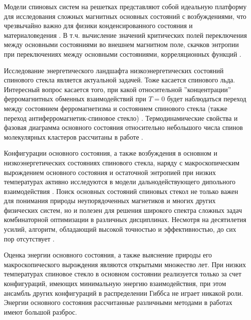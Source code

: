 \documentclass[utf8, babel, sor, jor, amsmath, amssymb, reprint]{elsarticle} %
\begin{document}
Модели спиновых систем на решетках представляют собой идеальную платформу для исследования сложных магнитных основных состояний с возбуждениями, что чрезвычайно важно для физики конденсированного состояния и материаловедения \cite{lacroix2011introduction}. В т.ч. вычисление значений критических полей переключения между основными состояниями во внешнем магнитном поле, скачков энтропии при переключениях между основными состояниями, корреляционных функций \cite{ramirez2004effect, rosas2004random, andriushchenko2019large}. 

Исследование энергетического ландшафта низкоэнергетических состояний спинового стекла \cite{biswas2023energy} является актуальной задачей. Тоже касается спинового льда. Интересный вопрос касается того, при какой относительной ''концентрации''  ферромагнитных обменных взаимодействий при $T=0$ будет наблюдаться переход между состоянием ферро\-маг\-не\-тиз\-ма и состоянием спинового стекла (также переход анти\-ферро\-маг\-не\-тик-спиновое стекло) \cite{gruzberg2001random, honecker2001universality, picco2006strong, tsomokos2011interplay, zimmer2022role}. Термодинамические свойства и фазовая диаграмма основного состояния относительно небольшого числа спинов молекулярных кластеров рассчитаны в работе \cite{dias2023ground}.

Конфигурации основного состояния, а также возбуждения в основном и низкоэнергетических состояниях спинового стекла, наряду с макроскопическим вырождением основного состояния и остаточной энтропией  при низких температурах активно исследуются в модели дальнодействующего дипольного взаимодействия \cite{makarova2021low, singh2024micromagnetic}. Поиск основных состояний спиновых стекол не только важен для понимания природы неупорядоченных магнетиков и многих других физических систем, но и полезен для решения широкого спектра сложных задач комбинаторной оптимизации в различных дисциплинах. Несмотря на десятилетия усилий, алгоритм, обладающий высокой точностью и эффективностью, до сих пор отсутствует \cite{fan2023searching}.

Оценка энергии основного состояния, а также выяснение природы его макроскопического вырождения являются открытыми множество лет. При низких температурах спиновое стекло в основном состоянии реализуется только за счет конфигураций, имеющих минимальную энергию взаимодействия, при этом ансамбль других конфигураций в распределении Гиббса не играет никакой роли. Энергии основного состояния рассчитанные различными методами в работах \cite{thouless1977solution, sherrington1975solvable, tanaka1980analytic, klein1976comparison, kirkpatrick1978infinite,  karandashev2019global, palmer1999ground, campbell2004energy, roma2009ground} имеют большой разброс.
\end{document}
